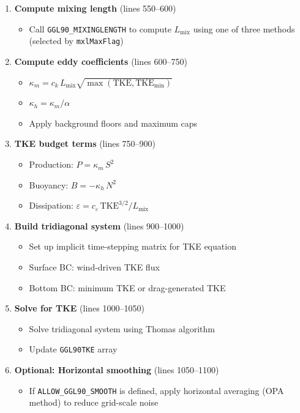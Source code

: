 \documentclass[12pt,letterpaper]{article}
\newcommand{\TKE}{\mathrm{TKE}}
\newcommand{\KM}{\kappa_m}
\newcommand{\KH}{\kappa_h}
\newcommand{\Lmix}{L_{\mathrm{mix}}}
\begin{document}
\begin{enumerate}[leftmargin=*, label=\textbf{Step \arabic*.}]
  \item \textbf{Compute mixing length} (lines 550--600)
    \begin{itemize}[label=$\circ$]
      \item Call \texttt{GGL90\_MIXINGLENGTH} to compute $\Lmix$ using one of
            three methods (selected by \texttt{mxlMaxFlag})
    \end{itemize}

  \item \textbf{Compute eddy coefficients} (lines 600--750)
    \begin{itemize}[label=$\circ$]
      \item $\KM = c_k \, \Lmix \sqrt{\max(\TKE, \TKE_{\mathrm{min}})}$
      \item $\KH = \KM / \alpha$
      \item Apply background floors and maximum caps
    \end{itemize}

  \item \textbf{TKE budget terms} (lines 750--900)
    \begin{itemize}[label=$\circ$]
      \item Production: $P = \KM \, S^2$
      \item Buoyancy: $B = -\KH \, N^2$
      \item Dissipation: $\varepsilon = c_\varepsilon \, \TKE^{3/2} / \Lmix$
    \end{itemize}

  \item \textbf{Build tridiagonal system} (lines 900--1000)
    \begin{itemize}[label=$\circ$]
      \item Set up implicit time-stepping matrix for TKE equation
      \item Surface BC: wind-driven TKE flux
      \item Bottom BC: minimum TKE or drag-generated TKE
    \end{itemize}

  \item \textbf{Solve for TKE} (lines 1000--1050)
    \begin{itemize}[label=$\circ$]
      \item Solve tridiagonal system using Thomas algorithm
      \item Update \texttt{GGL90TKE} array
    \end{itemize}

  \item \textbf{Optional: Horizontal smoothing} (lines 1050--1100)
    \begin{itemize}[label=$\circ$]
      \item If \texttt{ALLOW\_GGL90\_SMOOTH} is defined, apply horizontal
            averaging (OPA method) to reduce grid-scale noise
    \end{itemize}


\end{enumerate}
\end{document}
